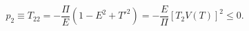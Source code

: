 \begin{equation}\label{epe}
p_{2}\equiv T_{22}=-\frac{\Pi}{E}(1-E^{2}+T'^{2})=-\frac{E}{\Pi}
[T_{2}V(T)]^{2}\le 0.
\end{equation}

